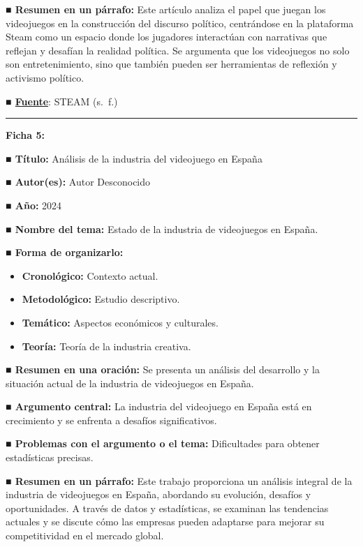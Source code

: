 \documentclass[
  letterpaper,
  DIV=11,
  numbers=noendperiod]{scrreprt}
\begin{document}
\textbf{■ Resumen en un párrafo:} Este artículo analiza el papel que
juegan los videojuegos en la construcción del discurso político,
centrándose en la plataforma Steam como un espacio donde los jugadores
interactúan con narrativas que reflejan y desafían la realidad política.
Se argumenta que los videojuegos no solo son entretenimiento, sino que
también pueden ser herramientas de reflexión y activismo político.

\textbf{■
\href{https://indexcomunicacion.es/index.php/indexcomunicacion/article/view/995}{Fuente}}:
STEAM (s.~f.)

\begin{center}\rule{0.5\linewidth}{0.5pt}\end{center}

\textbf{Ficha 5:}

\textbf{■ Título:} Análisis de la industria del videojuego en España

\textbf{■ Autor(es):} Autor Desconocido

\textbf{■ Año:} 2024

\textbf{■ Nombre del tema:} Estado de la industria de videojuegos en
España.

\textbf{■ Forma de organizarlo:}

\begin{itemize}
\item
  \textbf{Cronológico:} Contexto actual.
\item
  \textbf{Metodológico:} Estudio descriptivo.
\item
  \textbf{Temático:} Aspectos económicos y culturales.
\item
  \textbf{Teoría:} Teoría de la industria creativa.
\end{itemize}

\textbf{■ Resumen en una oración:} Se presenta un análisis del
desarrollo y la situación actual de la industria de videojuegos en
España.

\textbf{■ Argumento central:} La industria del videojuego en España está
en crecimiento y se enfrenta a desafíos significativos.

\textbf{■ Problemas con el argumento o el tema:} Dificultades para
obtener estadísticas precisas.

\textbf{■ Resumen en un párrafo:} Este trabajo proporciona un análisis
integral de la industria de videojuegos en España, abordando su
evolución, desafíos y oportunidades. A través de datos y estadísticas,
se examinan las tendencias actuales y se discute cómo las empresas
pueden adaptarse para mejorar su competitividad en el mercado global.
\end{document}
